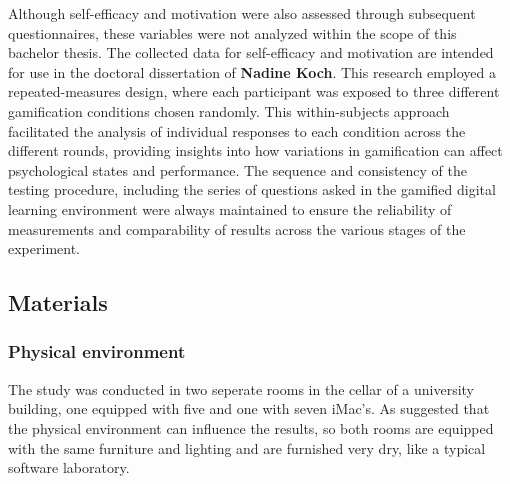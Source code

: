 Although self-efficacy and motivation were also assessed \parencite{chenValidationNewGeneral2001,guayAssessmentSituationalIntrinsic2000} through subsequent questionnaires, these variables were not analyzed within the scope of this bachelor thesis.
The collected data for self-efficacy and motivation are intended for use in the doctoral dissertation of \textbf{Nadine Koch}.
This research employed a repeated-measures design, where each participant was exposed to three different gamification conditions chosen randomly.
This within-subjects approach facilitated the analysis of individual responses to each condition across the different rounds, providing insights into how variations in gamification can affect psychological states and performance.
The sequence and consistency of the testing procedure, including the series of questions asked in the gamified digital learning environment were always maintained to ensure the reliability of measurements and comparability of results across the various stages of the experiment.


\subsection{Materials}
\subsubsection{Physical environment}
The study was conducted in two seperate rooms in the cellar of a university building, one equipped with five and one with seven iMac's.
As \textcite{christyLeaderboardsVirtualClassroom2014} suggested that the physical environment can influence the results, so both rooms are equipped with the same furniture and lighting and are furnished very dry, like a typical software laboratory.

